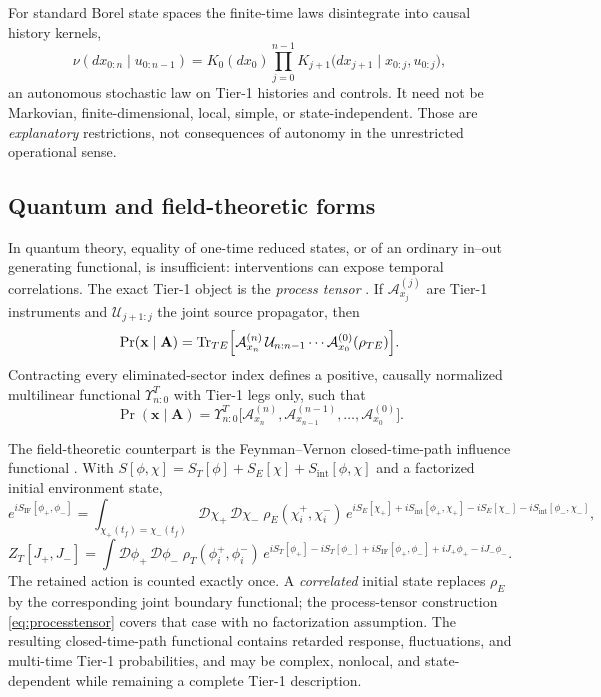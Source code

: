 \documentclass[11pt,a4paper]{article}
\theoremstyle{plain}
\theoremstyle{definition}
\newcommand{\Tr}{\operatorname{Tr}}
\begin{document}
For standard Borel state spaces the finite-time laws disintegrate into
causal history kernels,
\begin{equation}
\label{eq:disintegration}
\nu(dx_{0:n}\mid u_{0:n-1})
=K_0(dx_0)\prod_{j=0}^{n-1}
K_{j+1}\bigl(dx_{j+1}\mid x_{0:j},u_{0:j}\bigr),
\end{equation}
an autonomous stochastic law on Tier-1 histories and controls. It need
not be Markovian, finite-dimensional, local, simple, or state-independent.
Those are \emph{explanatory} restrictions, not consequences of autonomy
in the unrestricted operational sense.

\subsection{Quantum and field-theoretic forms}

In quantum theory, equality of one-time reduced states, or of an ordinary
in--out generating functional, is insufficient: interventions can expose
temporal correlations. The exact Tier-1 object is the \emph{process
tensor} \cite{Pollock}. If $\mathcal A^{(j)}_{x_j}$ are Tier-1
instruments and $\mathcal U_{j+1:j}$ the joint source propagator, then
\begin{equation}
\label{eq:processprob}
\Pr(\mathbf x\mid\mathbf A)
=\Tr_{TE}\Bigl[
\mathcal A^{(n)}_{x_n}\,\mathcal U_{n:n-1}\cdots
\mathcal A^{(0)}_{x_0}(\rho_{TE})\Bigr].
\end{equation}
Contracting every eliminated-sector index defines a positive, causally
normalized multilinear functional $\Upsilon^T_{n:0}$ with Tier-1 legs
only, such that
\begin{equation}
\label{eq:processtensor}
\Pr(\mathbf x\mid\mathbf A)
=\Upsilon^T_{n:0}\bigl[
\mathcal A^{(n)}_{x_n},\mathcal A^{(n-1)}_{x_{n-1}},\ldots,
\mathcal A^{(0)}_{x_0}\bigr].
\end{equation}

The field-theoretic counterpart is the Feynman--Vernon closed-time-path
influence functional \cite{FeynmanVernon}. With
$S[\phi,\chi]=S_T[\phi]+S_E[\chi]+S_{\mathrm{int}}[\phi,\chi]$ and a
factorized initial environment state,
\begin{equation}
\label{eq:IF}
e^{iS_{\mathrm{IF}}[\phi_+,\phi_-]}
=\int_{\chi_+(t_f)=\chi_-(t_f)}
\mathcal D\chi_+\,\mathcal D\chi_-\;
\rho_E(\chi^+_i,\chi^-_i)\,
e^{iS_E[\chi_+]+iS_{\mathrm{int}}[\phi_+,\chi_+]
-iS_E[\chi_-]-iS_{\mathrm{int}}[\phi_-,\chi_-]},
\end{equation}
\begin{equation}
\label{eq:ZT}
Z_T[J_+,J_-]
=\int\mathcal D\phi_+\,\mathcal D\phi_-\;
\rho_T(\phi^+_i,\phi^-_i)\,
e^{iS_T[\phi_+]-iS_T[\phi_-]
+iS_{\mathrm{IF}}[\phi_+,\phi_-]
+iJ_+\phi_+-iJ_-\phi_-} .
\end{equation}
The retained action is counted exactly once. A \emph{correlated} initial
state replaces $\rho_E$ by the corresponding joint boundary functional;
the process-tensor construction \eqref{eq:processtensor} covers that case
with no factorization assumption. The resulting closed-time-path
functional contains retarded response, fluctuations, and multi-time
Tier-1 probabilities, and may be complex, nonlocal, and state-dependent
while remaining a complete Tier-1 description.
\end{document}
